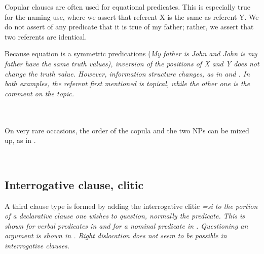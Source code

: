 Copular clauses are often used for equational predicates. This is especially true for the naming use, where we assert that referent X is the same as referent Y. We do not assert of any predicate that it is true of my father; rather, we assert that two referents are identical.

Because equation is a symmetric predications (\em My father is John \em and \em John is my father \em have the same truth values), inversion of the positions of X and Y does not change the truth value. However, information structure changes, as in  and . In both examples, the referent first mentioned is topical, while the other one is the comment on the topic.
 

 \\

 \\

On very rare occasions, the order of the copula and the two NPs can be mixed up, as in .

 \\


\subsection{Interrogative clause, clitic}\label{sec:cls:Interrogativeclauseclitic}
A third clause type is formed by adding the interrogative clitic \em =si \em to the portion of a declarative clause one wishes to question,  normally the predicate. This is shown for verbal predicates in  and for a nominal predicate in . Questioning an argument is shown in . Right dislocation does not seem to be possible in interrogative clauses.

